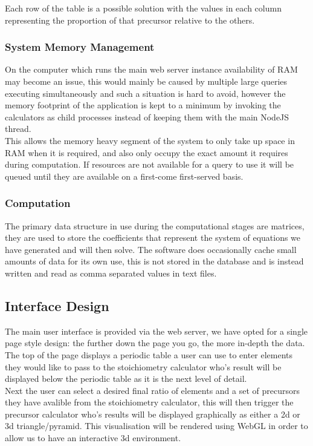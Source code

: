 Each row of the table is a possible solution with the values in each column representing the proportion of that precursor relative to the others.

\subsubsection{System Memory Management}
On the computer which runs the main web server instance availability of RAM may become an issue, this would mainly be caused by multiple large queries executing simultaneously and such a situation is hard to avoid, however the memory footprint of the application is kept to a minimum by invoking the calculators as child processes instead of keeping them with the main NodeJS thread.\\

This allows the memory heavy segment of the system to only take up space in RAM when it is required, and also only occupy the exact amount it requires during computation. If resources are not available for a query to use it will be queued until they are available on a first-come first-served basis. 

\subsubsection{Computation}
The primary data structure in use during the computational stages are matrices, they are used to store the coefficients that represent the system of equations we have generated and will then solve. The software does occasionally cache small amounts of data for its own use, this is not stored in the database and is instead written and read as comma separated values in text files.


\subsection{Interface Design}
The main user interface is provided via the web server, we have opted for a single page style design: the further down the page you go, the more in-depth the data. \\

The top of the page displays a periodic table a user can use to enter elements they would like to pass to the stoichiometry calculator who's result will be displayed below the periodic table as it is the next level of detail.\\

Next the user can select a desired final ratio of elements and a set of precursors they have avalible from the stoichiometry calculator, this will then trigger the precursor calculator who's results will be displayed graphically as either a 2d or 3d triangle/pyramid. This visualisation will be rendered using WebGL in order to allow us to have an interactive 3d environment. \\

